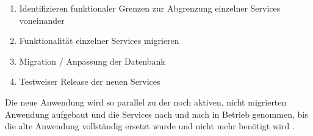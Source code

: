 \begin{enumerate}
    \item Identifizieren funktionaler Grenzen zur Abgrenzung einzelner Services voneinander
    \item Funktionalität einzelner Services migrieren
    \item Migration / Anpassung der Datenbank
    \item Testweiser Release der neuen Services
\end{enumerate}

Die neue Anwendung wird so parallel zu der noch aktiven, nicht migrierten Anwendung aufgebaut und die Services nach und nach in Betrieb genommen, bis die alte Anwendung vollständig ersetzt wurde und nicht mehr benötigt wird \cite[Vgl.][]{MarshBoourdon2019}\cite[Vgl.][]{Ibryam2021}\cite[Vgl.][]{Fowler2004}.
\pagebreak


